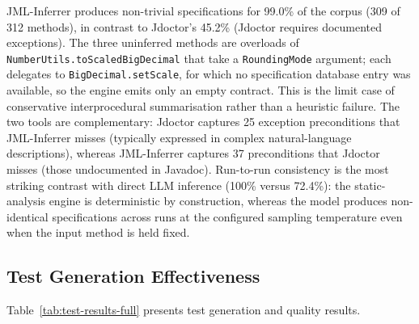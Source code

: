 JML-Inferrer produces non-trivial specifications for 99.0\% of the corpus (309 of 312 methods), in contrast to Jdoctor's 45.2\% (Jdoctor requires documented exceptions). The three uninferred methods are overloads of \texttt{NumberUtils.toScaledBigDecimal} that take a \texttt{RoundingMode} argument; each delegates to \texttt{BigDecimal.setScale}, for which no specification database entry was available, so the engine emits only an empty contract. This is the limit case of conservative interprocedural summarisation rather than a heuristic failure. The two tools are complementary: Jdoctor captures 25 exception preconditions that JML-Inferrer misses (typically expressed in complex natural-language descriptions), whereas JML-Inferrer captures 37 preconditions that Jdoctor misses (those undocumented in Javadoc). Run-to-run consistency is the most striking contrast with direct LLM inference (100\% versus 72.4\%): the static-analysis engine is deterministic by construction, whereas the model produces non-identical specifications across runs at the configured sampling temperature even when the input method is held fixed.

\subsection{Test Generation Effectiveness}

Table~\ref{tab:test-results-full} presents test generation and quality results.

